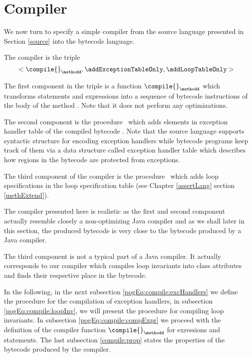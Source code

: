 

\newtheorem{Compiler}{Definition}

\section{Compiler} \label{compile}

We now turn to specify a simple compiler from the source language presented in Section
\ref{source} into the bytecode language.

The compiler is the triple
 $$< \compile{ }_{\methodd}, \addExceptionTableOnly , \addLoopTableOnly >$$

 The first component in the triple is a  function $\compile{ }_{\methodd}$  which transforms statements and expressions
 into a sequence of bytecode instructions of the body of the method \methodd.
 Note that it does not perform any optimizations.

 The second component is the procedure  
\addExceptionTableOnly \ which adds elements in exception handler table of the compiled bytecode \methodd.
Note that the source language supports syntactic structure for encoding exception handlers while
 bytecode programs keep track of them via a data structure called exception handler table which describes how  regions 
in the bytecode are protected from exceptions.

 The third component of the compiler is the procedure
  \addLoopTableOnly \ which adds  loop
specifications in the loop specification table (see Chapter \ref{assertLang} section \ref{methExtend}).

The compiler presented here is realistic as the first and second component actually resemble closely 
a non-optimizing Java compiler and as we shall later in this section, the produced bytecode 
is very close to the bytecode produced by  a Java compiler.

The third component is not a typical part of a Java compiler. It actually corresponds to our 
\JMLtoBML{} compiler which compiles  loop invariants into class attributes and finds their respective place in the bytecode.  


In the following, in the next subsection \ref{pogEq:compile:excHandlers} we define the procedure for the compilation of exception handlers,
 in subsection \ref{pogEq:compile:loopInv},  we will present the procedure for compiling loop invariants.
 In  subsection
\ref{pogEq:compile:compExpr} 
we proceed with the definition of the compiler function $\compile{ }_{\methodd} $ for exressions and statements. 
The last subsection \ref{compile:prop} states the properties of the bytecode produced by the compiler.




